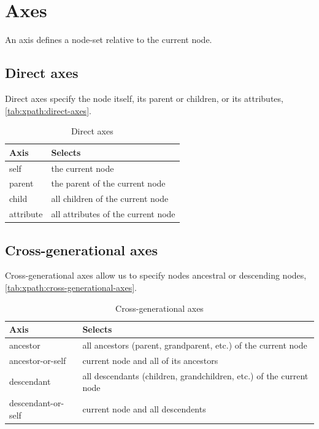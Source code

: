 \documentclass{pgnotes}
\begin{document}
\section{Axes}

An axis defines a node-set relative to the current node.

\subsection{Direct axes}

Direct axes specify the node itself, its parent or children, or its attributes, \autoref{tab:xpath:direct-axes}. 

\begin{table}[htbp]
  \begin{tabularx}{1.0\linewidth}{l X}
    \toprule
    \textbf{Axis} & \textbf{Selects} \\
    \midrule
    self & the current node \\
    parent & the parent of the current node \\
    child & all children of the current node \\
    attribute & all attributes of the current node \\
    \bottomrule
  \end{tabularx}
  \caption{Direct axes}
  \label{tab:xpath:direct-axes}
\end{table}


\subsection{Cross-generational axes} 

Cross-generational axes allow us to specify nodes ancestral or descending nodes, \autoref{tab:xpath:cross-generational-axes}. 

\begin{table}[htbp]
  \begin{tabularx}{1.0\linewidth}{l X}
    \toprule
    \textbf{Axis} & \textbf{Selects} \\
    \midrule
    ancestor & all ancestors (parent, grandparent, etc.) of the current node \\
    ancestor-or-self & current node and all of its ancestors \\
    descendant & all descendants (children, grandchildren, etc.) of the current node \\
    descendant-or-self & current node and all descendents \\
    \bottomrule
  \end{tabularx}
  \caption{Cross-generational axes}
  \label{tab:xpath:cross-generational-axes}
\end{table}
\end{document}
